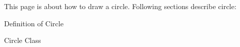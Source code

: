 This page is about how to draw a circle. Following sections describe circle\+:
\begin{DoxyItemize}
\item Definition of Circle
\item Circle Class 
\end{DoxyItemize}